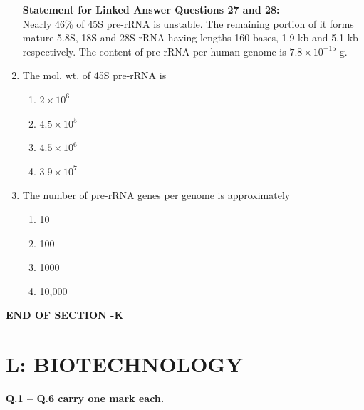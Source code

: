\documentclass[journal,12pt,onecolumn]{IEEEtran}
\begin{document}
\begin{enumerate}
\noindent \textbf{Statement for Linked Answer Questions 27 and 28:} \\
Nearly 46\% of 45S pre-rRNA is unstable. The remaining portion of it forms mature 5.8S, 18S and 28S rRNA having lengths 160 bases, 1.9 kb and 5.1 kb respectively. The content of pre rRNA per human genome is $7.8 \times 10^{-15}$ g.

\item The mol. wt. of 45S pre-rRNA is
\begin{multicols}{2}
\begin{enumerate}[label=(\Alph*)]
\item $2 \times 10^6$
\item $4.5 \times 10^5$
\item $4.5 \times 10^6$
\item $3.9 \times 10^7$
\end{enumerate}
\end{multicols}

\item The number of pre-rRNA genes per genome is approximately
\begin{multicols}{2}
\begin{enumerate}[label=(\Alph*)]
\item 10
\item 100
\item 1000
\item 10,000
\end{enumerate}
\end{multicols}

\end{enumerate}
\begin{center}
    \textbf{END OF SECTION -K}
\end{center}
\newpage
\section*{\centering L: BIOTECHNOLOGY}

\noindent\textbf{Q.1 – Q.6 carry one mark each.}
\end{document}
